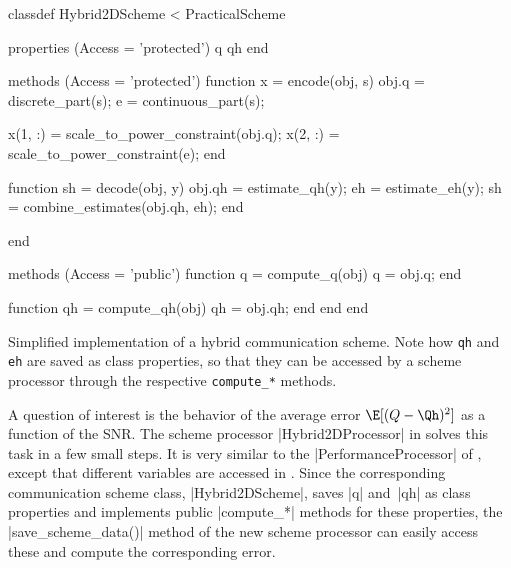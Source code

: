 \begin{listing}
\begin{Code}
  classdef Hybrid2DScheme < PracticalScheme
      
      properties (Access = 'protected')
          q
          qh
      end
      
      methods (Access = 'protected')
          function x = encode(obj, s)
              obj.q = discrete_part(s);
              e = continuous_part(s);
              
              x(1, :) = scale_to_power_constraint(obj.q);
              x(2, :) = scale_to_power_constraint(e);
          end
          
          function sh = decode(obj, y)
              obj.qh = estimate_qh(y);
              eh = estimate_eh(y);
              sh = combine_estimates(obj.qh, eh);
          end

      end

      methods (Access = 'public')
          function q = compute_q(obj)
              q = obj.q;
          end
          
          function qh = compute_qh(obj)
              qh = obj.qh;
          end
      end
  end
\end{Code}
\caption{Simplified implementation of a hybrid communication scheme. Note how
\texttt{qh} and \texttt{eh} are saved as class properties, so that they can be
accessed by a scheme processor through the respective \texttt{compute\_*}
methods.}
\label{lst:hybridscheme}
\end{listing}

A question of interest is the behavior of the average error $\E[(Q - \Qh)^2]$ as
a function of the SNR. The scheme processor |Hybrid2DProcessor| in
 solves this task in a few small steps. It is very
similar to the |PerformanceProcessor| of , except that
different variables are accessed in . Since the corresponding
communication scheme class, |Hybrid2DScheme|, saves |q| and~|qh| as class
properties and implements public |compute_*| methods for these properties,
the |save_scheme_data()| method of the new scheme processor can easily access
these and compute the corresponding error.

